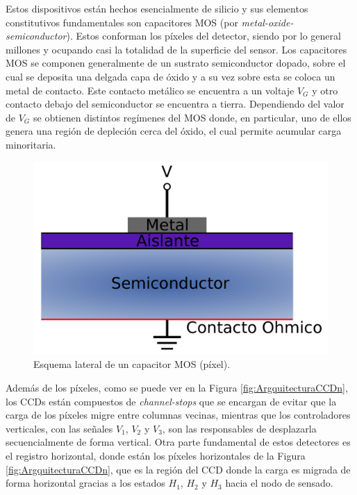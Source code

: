 Estos dispositivos están hechos esencialmente de silicio y sus elementos constitutivos fundamentales son capacitores MOS (por \textit{metal-oxide-semiconductor}). Estos conforman los píxeles del detector, siendo por lo general millones y ocupando casi la totalidad de la superficie del sensor. Los capacitores MOS se componen generalmente de un sustrato semiconductor dopado, sobre el cual se deposita una delgada capa de óxido y a su vez sobre esta se coloca un metal de contacto. Este contacto metálico se encuentra a un voltaje $V_{G}$ y otro contacto debajo del semiconductor se encuentra a tierra. 
Dependiendo del valor de $V_{G}$ se obtienen distintos regímenes del MOS\cite{Chenming} donde, en particular, uno de ellos genera una región de depleción cerca del óxido, el cual permite acumular carga minoritaria.
\begin{figure}[h]
    \centering
        \includegraphics[scale=.35]{Figs/PixelCrossSection.pdf}
    \caption{Esquema lateral de un capacitor MOS (píxel).}
    \label{fig:PixelCrossSection}
\end{figure}
Además de los píxeles, como se puede ver en la Figura \ref{fig:ArgquitecturaCCDn}, los CCDs están compuestos de \textit{channel-stops} que se encargan de evitar que la carga de los píxeles migre entre columnas vecinas, mientras que los controladores verticales, con las señales $V_{1}$, $V_{2}$ y $V_{3}$, son las responsables de desplazarla secuencialmente de forma vertical. 
Otra parte fundamental de estos detectores es el registro horizontal, donde están los píxeles horizontales de la Figura \ref{fig:ArgquitecturaCCDn}, que es la región del CCD donde la carga es migrada de forma horizontal gracias a los estados $H_{1}$, $H_{2}$ y $H_{3}$ hacia el nodo de sensado.
